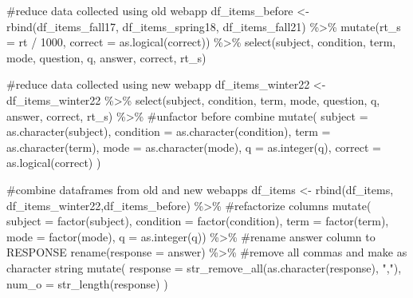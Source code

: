 \documentclass[
  letterpaper,
  DIV=11,
  numbers=noendperiod]{scrreprt}
\newenvironment{Shaded}{\begin{snugshade}}{\end{snugshade}}
\newcommand{\AttributeTok}[1]{\textcolor[rgb]{0.40,0.45,0.13}{#1}}
\newcommand{\CommentTok}[1]{\textcolor[rgb]{0.37,0.37,0.37}{#1}}
\newcommand{\DecValTok}[1]{\textcolor[rgb]{0.68,0.00,0.00}{#1}}
\newcommand{\FunctionTok}[1]{\textcolor[rgb]{0.28,0.35,0.67}{#1}}
\newcommand{\NormalTok}[1]{\textcolor[rgb]{0.00,0.23,0.31}{#1}}
\newcommand{\OtherTok}[1]{\textcolor[rgb]{0.00,0.23,0.31}{#1}}
\newcommand{\SpecialCharTok}[1]{\textcolor[rgb]{0.37,0.37,0.37}{#1}}
\newcommand{\StringTok}[1]{\textcolor[rgb]{0.13,0.47,0.30}{#1}}
\begin{document}
\begin{Shaded}
\begin{Highlighting}[]
\CommentTok{\#reduce data collected using old webapp}
\NormalTok{df\_items\_before }\OtherTok{\textless{}{-}} \FunctionTok{rbind}\NormalTok{(df\_items\_fall17, df\_items\_spring18, df\_items\_fall21) }\SpecialCharTok{\%\textgreater{}\%} 
  \FunctionTok{mutate}\NormalTok{(}\AttributeTok{rt\_s =}\NormalTok{ rt }\SpecialCharTok{/} \DecValTok{1000}\NormalTok{, }\AttributeTok{correct =} \FunctionTok{as.logical}\NormalTok{(correct)) }\SpecialCharTok{\%\textgreater{}\%} 
  \FunctionTok{select}\NormalTok{(subject, condition, term, mode, question, q, answer, correct, rt\_s) }
  
\CommentTok{\#reduce data collected using new webapp}
\NormalTok{df\_items\_winter22 }\OtherTok{\textless{}{-}}\NormalTok{ df\_items\_winter22 }\SpecialCharTok{\%\textgreater{}\%} 
  \FunctionTok{select}\NormalTok{(subject, condition, term, mode, question, q, answer, correct, rt\_s) }\SpecialCharTok{\%\textgreater{}\%} \CommentTok{\#unfactor before combine}
  \FunctionTok{mutate}\NormalTok{(}
    \AttributeTok{subject =} \FunctionTok{as.character}\NormalTok{(subject),}
    \AttributeTok{condition =} \FunctionTok{as.character}\NormalTok{(condition),}
    \AttributeTok{term =} \FunctionTok{as.character}\NormalTok{(term),}
    \AttributeTok{mode =} \FunctionTok{as.character}\NormalTok{(mode),}
    \AttributeTok{q =} \FunctionTok{as.integer}\NormalTok{(q),}
    \AttributeTok{correct =} \FunctionTok{as.logical}\NormalTok{(correct)}
\NormalTok{  )}

\CommentTok{\#combine dataframes from old and new webapps}
\NormalTok{df\_items }\OtherTok{\textless{}{-}} \FunctionTok{rbind}\NormalTok{(df\_items, df\_items\_winter22,df\_items\_before) }\SpecialCharTok{\%\textgreater{}\%} 
  \CommentTok{\#refactorize columns}
  \FunctionTok{mutate}\NormalTok{(}
    \AttributeTok{subject =} \FunctionTok{factor}\NormalTok{(subject),}
    \AttributeTok{condition =} \FunctionTok{factor}\NormalTok{(condition),}
    \AttributeTok{term =} \FunctionTok{factor}\NormalTok{(term),}
    \AttributeTok{mode =} \FunctionTok{factor}\NormalTok{(mode),}
    \AttributeTok{q =} \FunctionTok{as.integer}\NormalTok{(q)) }\SpecialCharTok{\%\textgreater{}\%} 
  \CommentTok{\#rename answer column to RESPONSE }
  \FunctionTok{rename}\NormalTok{(}\AttributeTok{response =}\NormalTok{ answer) }\SpecialCharTok{\%\textgreater{}\%} 
  \CommentTok{\#remove all commas and make as character string}
  \FunctionTok{mutate}\NormalTok{(}
    \AttributeTok{response =} \FunctionTok{str\_remove\_all}\NormalTok{(}\FunctionTok{as.character}\NormalTok{(response), }\StringTok{","}\NormalTok{),}
    \AttributeTok{num\_o =} \FunctionTok{str\_length}\NormalTok{(response)}
\NormalTok{  )}



\end{Highlighting}
\end{Shaded}
\end{document}
